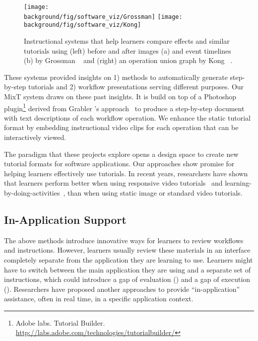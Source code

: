 \begin{figure*}[t!]
  \centering
  \texttt{[image: \\background/fig/software\_viz/Grossman]}
  \texttt{[image: \\background/fig/software\_viz/Kong]}
  \caption{Instructional systems that help learners compare effects and similar tutorials using (left) before and after images (a) and event timelines (b) by Grossman \ea{}~\cite{Grossman:2010jz} and (right) an operation union graph by Kong \ea{}~\cite{Kong:2012:DTR:2207676.2208549}.}
  \label{fig:related_comparison}
\end{figure*}

These systems provided insights on 1) methods to automatically generate step-by-step tutorials and 2) workflow presentations serving different purposes.
%
Our MixT system draws on these past insights. It is build on top of a Photoshop plugin\footnote{Adobe labs. Tutorial Builder. \url{http://labs.adobe.com/technologies/tutorialbuilder/}} derived from Grabler \ea{}'s approach~\cite{Grabler:2009jj} to produce a step-by-step document with text descriptions of each workflow operation. We enhance the static tutorial format by embedding instructional video clips for each operation that can be interactively viewed.

The paradigm that these projects explore opens a design space to create new tutorial formats for software applications. Our approaches show promise for helping learners effectively use tutorials. In recent years, researchers have shown that learners perform better when using responsive video tutorials~\cite{Nguyen:2015:MST:2702123.2702209} and learning-by-doing-activities~\cite{Kwon:2016:CEO:2858036.2858101}, than when using static image or standard video tutorials.


\subsection{In-Application Support}

The above methods introduce innovative ways for learners to review workflows and instructions. However, learners usually review these materials in an interface completely separate from the application they are learning to use. Learners might have to switch between the main application they are using and a separate set of instructions, which could introduce a gap of evaluation () and a gap of execution ().
%
Researchers have proposed another approaches to provide ``in-application'' assistance, often in real time, in a specific application context.

